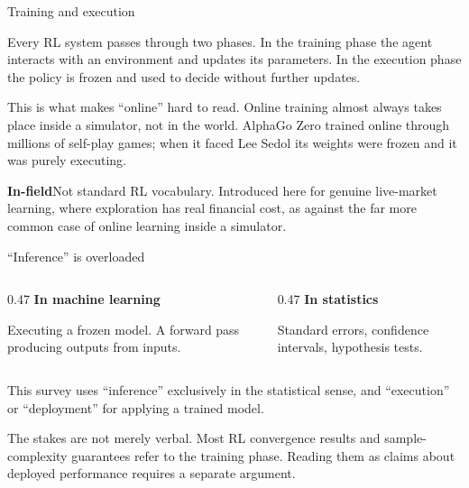 \begin{frame}{Training and execution}

Every RL system passes through two phases. In the \textcolor{rlblue}{training
phase} the agent interacts with an environment and updates its parameters. In the
\textcolor{rlblue}{execution phase} the policy is frozen and used to decide without
further updates.

\bigskip
This is what makes ``online'' hard to read. Online training almost always takes
place inside a simulator, not in the world. AlphaGo Zero trained online through
millions of self-play games; when it faced Lee Sedol its weights were frozen and it
was purely executing.

\bigskip
\textbf{\textcolor{rlorange}{In-field}}\quad Not standard RL vocabulary. Introduced
here for genuine live-market learning, where exploration has real financial cost,
as against the far more common case of online learning inside a simulator.
\end{frame}

\begin{frame}{``Inference'' is overloaded}

\begin{columns}[T]
\begin{column}{0.47\textwidth}
\textcolor{rlorange}{\textbf{In machine learning}}

\medskip
Executing a frozen model. A forward pass producing outputs from inputs.
\end{column}
\begin{column}{0.47\textwidth}
\textcolor{rlblue}{\textbf{In statistics}}

\medskip
Standard errors, confidence intervals, hypothesis tests.
\end{column}
\end{columns}

\bigskip
This survey uses ``inference'' exclusively in the statistical sense, and
``execution'' or ``deployment'' for applying a trained model.

\bigskip
The stakes are not merely verbal. Most RL convergence results and sample-complexity
guarantees refer to the \alert{training} phase. Reading them as claims about
deployed performance requires a separate argument.
\end{frame}

